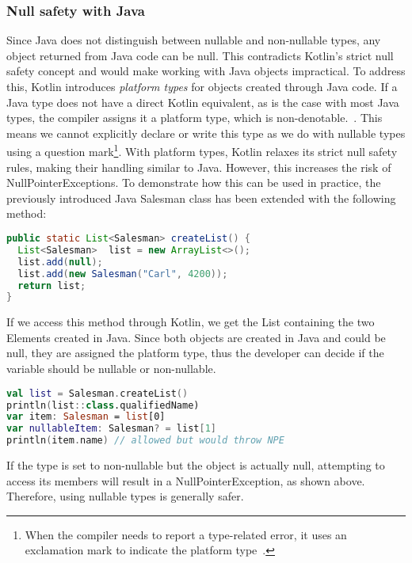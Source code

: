 \documentclass[a4paper,11pt]{article}
\begin{document}
\subsubsection{Null safety with Java}
Since Java does not distinguish between nullable and non-nullable types, any object returned from Java code can be null. This contradicts Kotlin's strict null safety concept and would make working with Java objects impractical.
To address this, Kotlin introduces \textit{platform types} for objects created through Java code. If a Java type does not have a direct Kotlin equivalent, as is the case with most Java types, the compiler assigns it a platform type, which is non-denotable.~\cite{interop-null-safety}. This means we cannot explicitly declare or write this type as we do with nullable types using a question mark\footnote{When the compiler needs to report a type-related error, it uses an exclamation mark to indicate the platform type~\cite{interop-platform-notation}.}. With platform types, Kotlin relaxes its strict null safety rules, making their handling similar to Java. However, this increases the risk of NullPointerExceptions.
To demonstrate how this can be used in practice, the previously introduced Java Salesman class has been extended with the following method:
\begin{lstlisting}[language=Java]
public static List<Salesman> createList() {
  List<Salesman>  list = new ArrayList<>();
  list.add(null);
  list.add(new Salesman("Carl", 4200));
  return list;
}
\end{lstlisting}
If we access this method through Kotlin, we get the List containing the two Elements created in Java. Since both objects are created in Java and could be null, they are assigned the platform type, thus the developer can decide if the variable should be nullable or non-nullable.
\begin{lstlisting}[language=Kotlin]  
val list = Salesman.createList()
println(list::class.qualifiedName)
var item: Salesman = list[0]
var nullableItem: Salesman? = list[1]
println(item.name) // allowed but would throw NPE
\end{lstlisting}
If the type is set to non-nullable but the object is actually null, attempting to access its members will result in a NullPointerException, as shown above. Therefore, using nullable types is generally safer.
\end{document}
